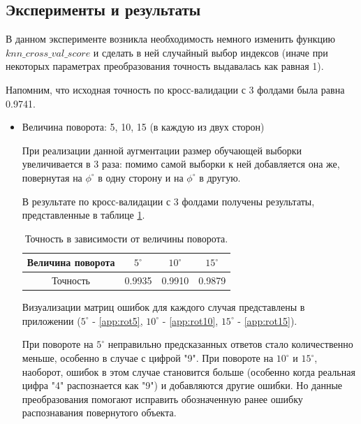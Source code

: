 \documentclass{article}
\begin{document}
\subsection{Эксперименты и результаты}

В данном эксперименте возникла необходимость немного изменить функцию $ knn\_cross\_val\_score $ и сделать в ней случайный выбор индексов (иначе при некоторых параметрах преобразования точность выдавалась как равная 1).

Напомним, что исходная точность по кросс-валидации с 3 фолдами была равна 0.9741.

\begin{itemize}
    \item Величина поворота: 5, 10, 15 (в каждую из двух сторон)
    
    При реализации данной аугментации размер обучающей выборки увеличивается в 3 раза: помимо самой выборки к ней добавляется она же, повернутая на $\phi ^\circ$ в одну сторону и на $\phi ^\circ$ в другую.
    
    В результате по кросс-валидации с 3 фолдами получены результаты, представленные в таблице \ref{tab:widgets4}.
    
    \begin{table}[h]
    \begin{center}
    \begin{tabular}{|*{4}{c|}}\hline
    Величина поворота & $ 5 ^\circ$  & $10 ^\circ$ & $15 ^\circ$ \\\hline
    Точность &  0.9935 &  0.9910 & 0.9879 \\\hline
    \end{tabular}
    \caption{\label{tab:widgets4} Точность в зависимости от величины поворота.}
    \end{center}
    \end{table}
    
    Визуализации матриц ошибок для каждого случая представлены в приложении ($ 5 ^\circ$ - \ref{app:rot5}, $10 ^\circ$ - \ref{app:rot10}, $15 ^\circ$ - \ref{app:rot15}).
    
    При повороте на $ 5 ^\circ$ неправильно предсказанных ответов стало количественно меньше, особенно в случае с цифрой "9". При повороте на $10 ^\circ$ и $15 ^\circ$, наоборот, ошибок в этом случае становится больше (особенно когда реальная цифра "4"{ } распознается как "9") и добавляются другие ошибки. Но данные преобразования помогают исправить обозначенную ранее ошибку распознавания повернутого объекта.


\end{itemize}
\end{document}
